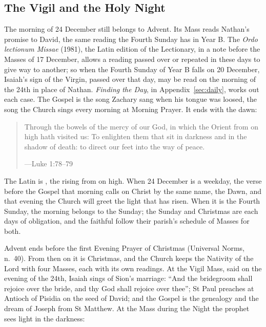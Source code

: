 \subsection{The Vigil and the Holy Night}\label{sec:vigil}

The morning of 24 December still belongs to Advent. Its Mass reads Nathan's
promise to David, the same reading the Fourth Sunday has in Year B. The
\emph{Ordo lectionum Missae} (1981), the Latin edition of the Lectionary, in a
note before the Masses of 17 December, allows a reading passed over or repeated
in these days to give way to another; so when the Fourth Sunday of Year B falls
on 20 December, Isaiah's sign of the Virgin, passed over that day, may be read on
the morning of the 24th in place of Nathan. \emph{Finding the Day}, in
Appendix~\ref{sec:daily}, works out each case. The Gospel is the song Zachary
sang when his tongue was loosed, the song the Church sings every morning at Morning Prayer. It
ends with the dawn:

\begin{quote}
Through the bowels of the mercy of our God, in which the Orient from on high
hath visited us: To enlighten them that sit in darkness and in the shadow of
death: to direct our feet into the way of peace.\par
{\smallskip\noindent\small ---Luke 1:78--79\par}
\end{quote}

\noindent The Latin is , the rising from on high. When 24
December is a weekday, the verse before the Gospel that morning calls on Christ
by the same name, the Dawn, and that evening the Church will greet the light
that has risen. When it is the Fourth Sunday, the morning belongs to the
Sunday; the Sunday and Christmas are each days of obligation, and the faithful
follow their parish's schedule of Masses for both.

Advent ends before the first Evening Prayer of Christmas (Universal Norms,
n.~40). From then on it is Christmas, and the Church keeps the Nativity of the Lord with four Masses, each
with its own readings. At the Vigil Mass, said on the evening of the 24th,
Isaiah sings of Sion's marriage: ``And the bridegroom shall rejoice over the
bride, and thy God shall rejoice over thee''; St Paul preaches at Antioch of
Pisidia on the seed of David; and the Gospel is the genealogy and the dream of
Joseph from St Matthew. At the Mass during the Night the prophet sees light in
the darkness:

